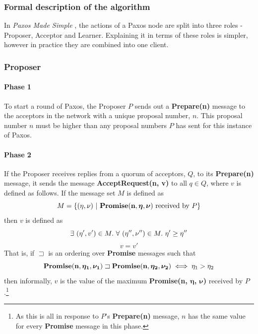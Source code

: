 \documentclass[12pt,twoside,notitlepage]{report}
\newcommand{\msg}[1] {{\bf #1}}         %
\begin{document}
\subsubsection*{Formal description of the algorithm}
In \emph{Paxos Made Simple} \cite{lamport01}, the actions of a Paxos node are split into three
roles - Proposer, Acceptor and Learner. Explaining it in terms of these roles is simpler, however
in practice they are combined into one client.

\subsubsection*{Proposer}

\paragraph{Phase 1}

To start a round of Paxos, the Proposer $P$ sends out a \msg{Prepare(n)} message to the acceptors in
the network with a unique proposal number, $n$. This proposal number $n$ must
be higher than any proposal numbers $P$ has sent for this instance of Paxos.

\paragraph{Phase 2}

If the Proposer receives replies from a quorum of acceptors, $Q$,
to its \msg{Prepare(n)} message, it sends the message \msg{AcceptRequest(n, v)} to all
$q \in Q$, where $v$ is defined as follows. If the message set $M$ is defined as
\begin{displaymath}
M = \{(\eta, \nu)~|~\msg{Promise(n, \bm{\eta}, \bm{\nu})}~\textrm{received by}~P\}
\end{displaymath}
then $v$ is defined as
\begin{displaymath}
\exists~(\eta', v') \in M.~\forall~(\eta'', \nu'') \in M.~\eta' \ge \eta'' \\
\end{displaymath}
\begin{displaymath}
v = v'
\end{displaymath}
That is, if $\sqsupset$ is an ordering over \msg{Promise} messages such that
\begin{displaymath}
	\msg{Promise(n, \bm{\eta_1}, \bm{\nu_1})} \sqsupset \msg{Promise(n, \bm{\eta_2}, \bm{\nu_2})}
	\iff \eta_1 > \eta_2
\end{displaymath}
then informally, $v$ is the value of the maximum \msg{Promise(n, $\bm{\eta}$, $\bm{\nu}$)} received by
$P$.\footnote{
As this is all in response to $P$'s \msg{Prepare(n)} message, $n$ has the same value for
every \msg{Promise} message in this phase.}
\end{document}
